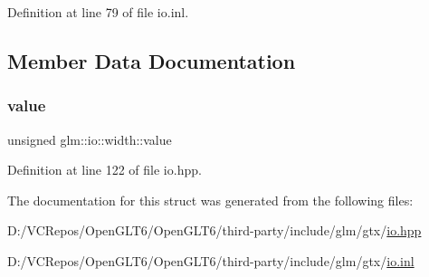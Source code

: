 Definition at line 79 of file io.\+inl.



\subsection{Member Data Documentation}
\mbox{\label{structglm_1_1io_1_1width_a6bf1338eb947811d36ec93bd2e9b8425}} 
\subsubsection{\texorpdfstring{value}{value}}
{\footnotesize\ttfamily unsigned glm\+::io\+::width\+::value}



Definition at line 122 of file io.\+hpp.



The documentation for this struct was generated from the following files\+:\begin{DoxyCompactItemize}
\item 
D\+:/\+V\+C\+Repos/\+Open\+G\+L\+T6/\+Open\+G\+L\+T6/third-\/party/include/glm/gtx/\mbox{\hyperlink{io_8hpp}{io.\+hpp}}\item 
D\+:/\+V\+C\+Repos/\+Open\+G\+L\+T6/\+Open\+G\+L\+T6/third-\/party/include/glm/gtx/\mbox{\hyperlink{io_8inl}{io.\+inl}}\end{DoxyCompactItemize}
